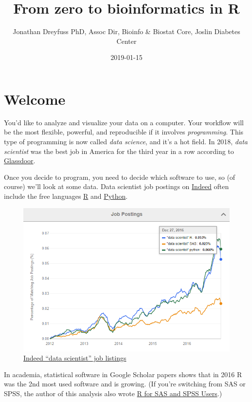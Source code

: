 \documentclass[]{article}
\title{From zero to bioinformatics in R}
\author{Jonathan Dreyfuss PhD, Assoc Dir, Bioinfo \& Biostat Core, Joslin
Diabetes Center}
\date{2019-01-15}
\begin{document}
\maketitle

\section{Welcome}\label{welcome}

You'd like to analyze and visualize your data on a computer. Your
workflow will be the most flexible, powerful, and reproducible if it
involves \emph{programming}. This type of programming is now called
\emph{data science}, and it's a hot field. In 2018, \emph{data
scientist} was the best job in America for the third year in a row
according to
\href{https://www.glassdoor.com/List/Best-Jobs-in-America-LST_KQ0,20.htm}{Glassdoor}.

Once you decide to program, you need to decide which software to use, so
(of course) we'll look at some data. Data scientist job postings on
\href{https://www.indeed.com}{Indeed} often include the free languages
\href{https://www.r-project.org/}{R} and
\href{https://www.python.org/}{Python}.

\begin{figure}
\centering
\includegraphics{job_trends.png}
\caption{\href{https://blog.revolutionanalytics.com/2017/02/job-trends-for-r-and-python.html}{Indeed
``data scientist'' job listings}}
\end{figure}

In academia, statistical software in Google Scholar papers shows that in
2016 R was the 2nd most used software and is growing. (If you're
switching from SAS or SPSS, the author of this analysis also wrote
\href{http://r4stats.com/books/r4sas-spss/}{R for SAS and SPSS Users}.)
\end{document}
